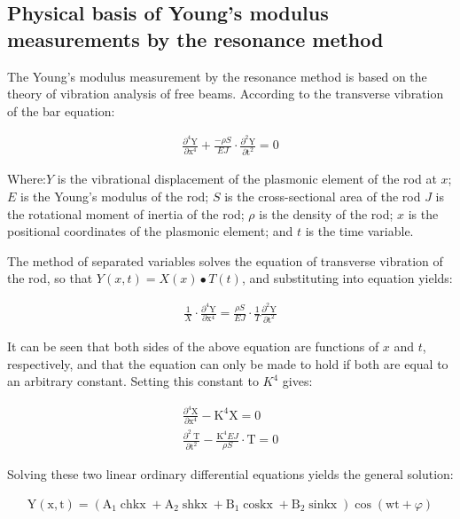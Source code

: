 \documentclass[UTF8]{article}
\begin{document}
    \subsection{Physical basis of Young's modulus measurements by the resonance method}
    The Young's modulus measurement by the resonance method is based on the theory of vibration analysis of free beams. According to the transverse vibration of the bar equation:
    
    \begin{eqnarray}
    \frac{\partial^{4} \mathrm{Y}}{\partial \mathrm{x}^{4}}+\frac{-\rho S}{E J} \cdot \frac{\partial^{2} \mathrm{Y}}{\partial \mathrm{t}^{2}}=0
    \end{eqnarray}
    
    Where:$Y$ is the vibrational displacement of the plasmonic element of the rod at $x$; $E$ is the Young's modulus of the rod; $S$ is the cross-sectional area of the rod $J$ is the rotational moment of inertia of the rod; $\rho$ is the density of the rod; $x$ is the positional coordinates of the plasmonic element; and $t$ is the time variable.
    
    The method of separated variables solves the equation of transverse vibration of the rod, so that $Y(x, t) = X(x)∙T(t)$, and substituting into equation yields:
    
    \begin{eqnarray}
    \frac{1}{X} \cdot \frac{\partial^{4} \mathrm{Y}}{\partial \mathrm{x}^{4}}=\frac{\rho S}{E J} \cdot \frac{1}{T} \frac{\partial^{2} \mathrm{Y}}{\partial \mathrm{t}^{2}}
    \end{eqnarray}
    
    It can be seen that both sides of the above equation are functions of $x$ and $t$, respectively, and that the equation can only be made to hold if both are equal to an arbitrary constant. Setting this constant to $K^4$ gives:
    
    \begin{eqnarray}
    \frac{\partial^{4} \mathrm{X}}{\partial \mathrm{x}^{4}}-\mathrm{K}^{4} \mathrm{X}=0 \\
    \frac{\partial^{2} \mathrm{~T}}{\partial \mathrm{t}^{2}}-\frac{\mathrm{K}^{4} E J}{\rho S} \cdot \mathrm{T}=0 
    \end{eqnarray}
    
    Solving these two linear ordinary differential equations yields the general solution:
    
    \begin{eqnarray}
    \mathrm{Y}(\mathrm{x}, \mathrm{t})=\left(\mathrm{A}_{1} \operatorname{chkx}+\mathrm{A}_{2} \operatorname{shkx}+\mathrm{B}_{1} \operatorname{coskx}+\mathrm{B}_{2} \operatorname{sinkx}\right) \cos (\mathrm{wt}+\varphi)
    \end{eqnarray}
    
\end{document}

